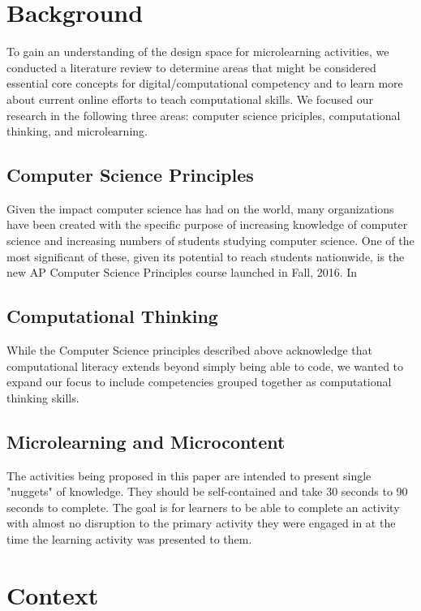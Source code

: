 \documentclass{sigchi}
\begin{document}
\section{Background}
To gain an understanding of the design space for microlearning activities, we conducted a
literature review to determine areas that might be considered essential core concepts for
digital/computational competency and to learn more about current online efforts to teach 
computational skills. We focused our research in the following three areas: computer science
priciples, computational thinking, and microlearning.

\subsection{Computer Science Principles}
Given the impact computer science has had on the world, many organizations have been 
created with the specific purpose of increasing knowledge of computer science and
increasing numbers of students studying computer science. One of the most significant 
of these, given its potential to reach students nationwide, is the new AP Computer Science
Principles course launched in Fall, 2016. In 

\subsection{Computational Thinking}

While the Computer Science principles described above acknowledge that computational
literacy extends beyond simply being able to code, we wanted to expand our focus to include
competencies grouped together as computational thinking skills.

\subsection{Microlearning and Microcontent}

The activities being proposed in this paper are intended to present single "nuggets" of knowledge. 
They should be self-contained and take 30 seconds to 90 seconds to complete. The goal is for
learners to be able to complete an activity with almost no disruption to the primary 
activity they were engaged in at the time the learning activity was presented to them.

\section{Context}
\end{document}
